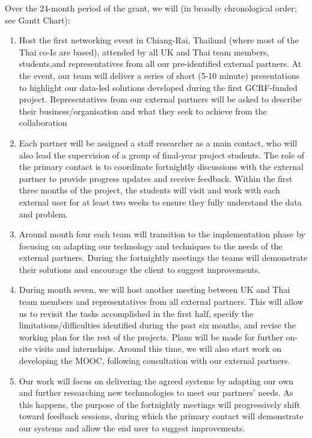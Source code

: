 \documentclass[11pt]{article}
\begin{document}
  \noindent
  Over the 24-month period of the grant, we will (in broadly chronological order; see Gantt Chart):
  \begin{enumerate}[leftmargin=6mm,itemsep=-3pt,topsep=1pt]
  \item Host the first networking event in Chiang-Rai, Thailand (where most of the Thai co-Is are based), attended by all UK and Thai team members, students,and representatives from all our pre-identified external partners. At the event, our team will deliver a series of short (5-10 minute) presentations to highlight our data-led solutions developed during the first GCRF-funded project. Representatives from our external partners will be asked to describe their business/organisation and what they seek to achieve from the collaboration
  \item Each partner will be assigned a staff researcher as a main contact, who will also lead the supervision of a group of final-year project students. The role of the primary contact is to coordinate fortnightly discussions with the external partner to provide progress updates and receive feedback. Within the first three months of the project, the students will visit and work with each external user for at least two weeks to ensure they fully understand the data and problem.
  \item Around month four each team will transition to the implementation phase by focusing on adapting our technology and techniques to the needs of the external partners. During the fortnightly meetings the teams will demonstrate their solutions and encourage the client to suggest improvements.
  \item During month seven, we will host another meeting between UK and Thai team members and representatives from all external partners. This will allow us to revisit the tasks accomplished in the first half, specify the limitations/difficulties identified during the past six months, and revise the working plan for the rest of the projects. Plans will be made for further on-site visits and internships. Around this time, we will also start work on developing the MOOC, following consultation with our external partners.
  \item Our work will focus on delivering the agreed systems by adapting our own and further researching new technnologies to meet our partners' needs. As this happens, the purpose of the fortnightly meetings will progressively shift toward feedback sessions, during which the primary contact will demonstrate our systems and allow the end user to suggest improvements. 

\end{enumerate}
\end{document}
